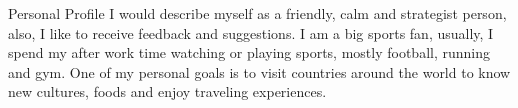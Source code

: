 \documentclass[
	11pt, %
]{resume} %
\begin{document}
\begin{rSection}{Personal Profile}
\justifying
I would describe myself as a friendly, calm and strategist person, also, I like to receive feedback and suggestions. I am a big sports fan, usually, I spend my after work time watching or playing sports, mostly football, running and gym. One of my personal goals is to visit countries around the world to know new cultures, foods and enjoy traveling experiences.
	
\end{rSection}
\end{document}
